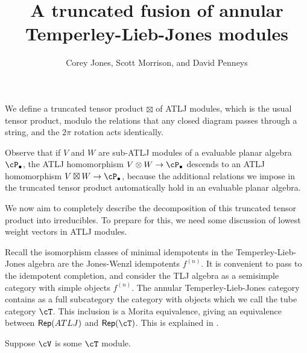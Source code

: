 \documentclass[12pt]{article}
\title{A truncated fusion of annular Temperley-Lieb-Jones modules}
\author{Corey Jones, Scott Morrison, and David Penneys}
\begin{document}
\maketitle


We define a truncated tensor product $\boxtimes$ of ATLJ modules, which is the usual tensor product, modulo the relations that
any closed diagram passes through a string, and
the $2\pi$ rotation acts identically.

Observe that if $V$ and $W$ are sub-ATLJ modules of a evaluable planar algebra $\cP_\bullet$, the ATLJ homomorphism $V \otimes W \to \cP_\bullet$ descends to an ATLJ homomorphism $V \boxtimes W \to \cP_\bullet$, because the additional relations we impose in the truncated tensor product automatically hold in an evaluable planar algebra.

We now aim to completely describe the decomposition of this truncated tensor product into irreducibles. 
To prepare for this, we need some discussion of lowest weight vectors in ATLJ modules.

Recall the isomorphism classes of minimal idempotents in the Temperley-Lieb-Jones algebra are the Jones-Wenzl idempotents $f^{(n)}$. 
It is convenient to pass to the idempotent completion, and consider the TLJ algebra as a semisimple category with simple objects $f^{(n)}$. 
The annular Temperley-Lieb-Jones category contains as a full subcategory the category with objects  which we call the tube category $\cT$. This inclusion is a Morita equivalence, giving an equivalence between ${\sf Rep}(ATLJ)$ and $\Rep(\cT)$. This is explained in \cite[Proposition 3.5]{1502.06543}.


Suppose $\cV$ is some $\cT$ module.
\end{document}
